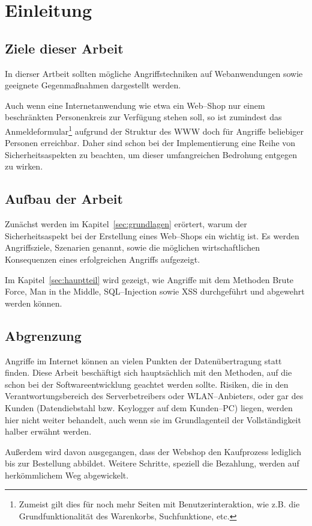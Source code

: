\section{Einleitung}
\label{sec:einleitung}


\subsection{Ziele dieser Arbeit}

In dierser Artbeit sollten mögliche Angriffstechniken auf Webanwendungen 
sowie geeignete Gegenmaßnahmen dargestellt werden.

Auch wenn eine Internetanwendung wie etwa ein Web--Shop nur einem beschränkten Personenkreis zur Verfügung stehen soll,
so ist zumindest das Anmeldeformular\footnote{Zumeist gilt dies für noch mehr Seiten mit Benutzerinteraktion, wie z.B. die Grundfunktionalität des Warenkorbs, Suchfunktione, etc.} aufgrund der Struktur des \ac{WWW} doch für Angriffe beliebiger Personen erreichbar.
Daher sind schon bei der Implementierung eine Reihe von Sicherheitsaspekten zu beachten, um dieser umfangreichen Bedrohung entgegen zu wirken.

\subsection{Aufbau der Arbeit}

Zunächst werden im Kapitel~\ref{sec:grundlagen} erörtert, warum der Sicherheitsaspekt bei der Erstellung eines Web–Shops ein wichtig ist. Es werden Angriffsziele, Szenarien genannt, sowie die möglichen wirtschaftlichen Konsequenzen eines erfolgreichen Angriffs aufgezeigt. 

Im Kapitel~\ref{sec:hauptteil} wird gezeigt, wie Angriffe mit dem Methoden Brute Force, Man in the Middle, SQL--Injection sowie \ac{XSS} durchgeführt und abgewehrt werden können.

\subsection{Abgrenzung}

Angriffe im Internet können an vielen Punkten der Datenübertragung statt finden. Diese Arbeit beschäftigt sich hauptsächlich mit den Methoden, auf die schon bei der Softwareentwicklung geachtet werden sollte. Risiken, die in den Verantwortungsbereich des Serverbetreibers oder WLAN--Anbieters, oder gar des Kunden (Datendiebstahl bzw. Keylogger auf dem Kunden--PC) liegen, werden hier nicht weiter behandelt, auch wenn sie im Grundlagenteil der Vollständigkeit halber erwähnt werden.

Außerdem wird davon ausgegangen, dass der Webshop den Kaufprozess lediglich bis zur Bestellung abbildet. Weitere Schritte, speziell die Bezahlung, werden auf herkömmlichem Weg abgewickelt.